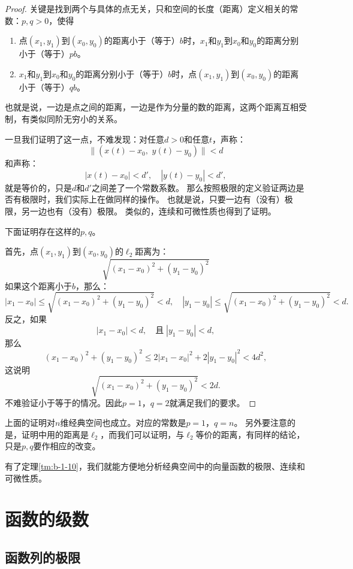 \documentclass[12pt,UTF8,fontset=none]{ctexbook}
\begin{document}
\begin{appendix}
\begin{proof}
    关键是找到两个与具体的点无关，只和空间的长度（距离）定义相关的常数：$p,q>0$，使得
    \begin{enumerate}
        \item 点$(x_1, y_1)$到$(x_0, y_0)$的距离小于（等于）$b$时，$x_1$和$y_1$到$x_0$和$y_0$的距离分别小于（等于）$pb$。
        \item $x_1$和$y_1$到$x_0$和$y_0$的距离分别小于（等于）$b$时，点$(x_1, y_1)$到$(x_0, y_0)$的距离小于（等于）$qb$。
    \end{enumerate}
    也就是说，一边是点之间的距离，一边是作为分量的数的距离，这两个距离互相受制，有类似同阶无穷小的关系。
    
    一旦我们证明了这一点，不难发现：对任意$d>0$和任意$t$，声称：
    $$ \|(x(t) - x_0,\,\, y(t) - y_0)\| < d $$
    和声称：
    $$ |x(t) - x_0| < d' , \quad |y(t) - y_0 | < d', $$
    就是等价的，只是$d$和$d'$之间差了一个常数系数。
    那么按照极限的定义验证两边是否有极限时，我们实际上在做同样的操作。
    也就是说，只要一边有（没有）极限，另一边也有（没有）极限。
    类似的，连续和可微性质也得到了证明。

    下面证明存在这样的$p,q$。

    首先，点$(x_1, y_1)$到$(x_0, y_0)$的$\ell_2$距离为：
    $$ \sqrt{(x_1 - x_0)^2 + ( y_1 - y_0)^2} $$
    如果这个距离小于$b$，那么：
    $$ |x_1 - x_0| \leqslant \sqrt{(x_1 - x_0)^2 + ( y_1 - y_0)^2} < d, \quad |y_1 - y_0| \leqslant \sqrt{(x_1 - x_0)^2 + ( y_1 - y_0)^2} < d. $$
    反之，如果
    $$ |x_1 - x_0| < d, \quad \mbox{且}\; |y_1 - y_0| < d, $$
    那么
    $$ (x_1 - x_0)^2 + ( y_1 - y_0)^2 \leqslant 2|x_1 - x_0|^2 + 2|y_1 - y_0|^2 < 4d^2, $$
    这说明
    $$ \sqrt{(x_1 - x_0)^2 + ( y_1 - y_0)^2} < 2d. $$
    不难验证小于等于的情况。因此$p = 1$，$q = 2$就满足我们的要求。

\end{proof}

上面的证明对$n$维经典空间也成立。对应的常数是$p = 1$，$q = n$。
另外要注意的是，证明中用的距离是$\ell_2$，而我们可以证明，与$\ell_2$等价的距离，有同样的结论，只是$p,q$要作相应的改变。

有了定理\ref{tm:b-1-10}，我们就能方便地分析经典空间中的向量函数的极限、连续和可微性质。

\chapter{函数的级数}

\section{函数列的极限}


\end{appendix}
\end{document}
